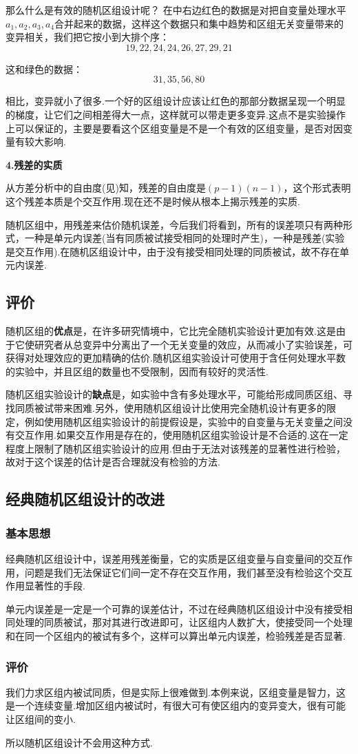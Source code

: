 那么什么是有效的随机区组设计呢？
在中右边红色的数据是对把自变量处理水平$a_1,a_2,a_3,a_4$合并起来的数据，这样这个数据只和集中趋势和区组无关变量带来的变异相关，我们把它按小到大排个序：
\[ 19,22,24,24,26,27,29,21 \]

这和绿色的数据：
\[ 31,35,56,80 \]

相比，变异就小了很多.一个好的区组设计应该让红色的那部分数据呈现一个明显的梯度，让它们之间相差得大一点，这样就可以带走更多变异.这点不是实验操作上可以保证的，主要是要看这个区组变量是不是一个有效的区组变量，是否对因变量有较大影响.

\textbf{4.残差的实质}

从方差分析中的自由度(见)知，残差的自由度是$(p-1)(n-1)$，这个形式表明这个残差本质是个交互作用.现在还不是时候从根本上揭示残差的实质.

随机区组中，用残差来估价随机误差，今后我们将看到，所有的误差项只有两种形式，一种是单元内误差(当有同质被试接受相同的处理时产生)，一种是残差(实验是交互作用).在随机区组设计中，由于没有接受相同处理的同质被试，故不存在单元内误差.

\subsection{评价}
随机区组的\textbf{优点}是，在许多研究情境中，它比完全随机实验设计更加有效.这是由于它使研究者从总变异中分离出了一个无关变量的效应，从而减小了实验误差，可获得对处理效应的更加精确的估价.随机区组实验设计可使用于含任何处理水平数的实验中，并且区组的数量也不受限制，因而有较好的灵活性.

随机区组实验设计的\textbf{缺点}是，如实验中含有多处理水平，可能给形成同质区组、寻找同质被试带来困难.另外，使用随机区组设计比使用完全随机设计有更多的限定，例如使用随机区组实验设计的前提假设是，实验中的自变量与无关变量之间没有交互作用.如果交互作用是存在的，使用随机区组实验设计是不合适的.这在一定程度上限制了随机区组实验设计的应用.但由于无法对该残差的显著性进行检验，故对于这个误差的估计是否合理就没有检验的方法.

\subsection{经典随机区组设计的改进}
\subsubsection{基本思想}
经典随机区组设计中，误差用残差衡量，它的实质是区组变量与自变量间的交互作用，问题是我们无法保证它们间一定不存在交互作用，我们甚至没有检验这个交互作用显著性的手段.

单元内误差是一定是一个可靠的误差估计，不过在经典随机区组设计中没有接受相同处理的同质被试，那对其进行改进即可，让区组内人数扩大，使接受同一个处理和在同一个区组内的被试有多个，这样可以算出单元内误差，检验残差是否显著.

\subsubsection{评价}
我们力求区组内被试同质，但是实际上很难做到.本例来说，区组变量是智力，这是一个连续变量.增加区组内被试时，有很大可有使区组内的变异变大，很有可能让区组间的变小.

所以随机区组设计不会用这种方式.